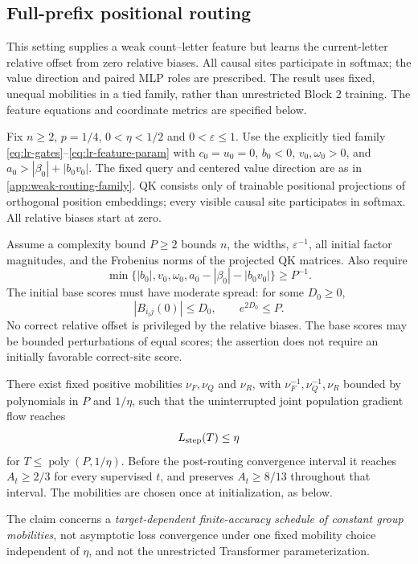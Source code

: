\subsection{Full-prefix positional routing}
\label{app:weak-seeded-full-prefix-routing}

This setting supplies a weak count--letter feature but learns the current-letter
relative offset from zero relative biases. All causal sites participate in
softmax; the value direction and paired MLP roles are prescribed. The result
uses fixed, unequal mobilities in a tied family, rather than unrestricted Block 2
training. The feature equations and coordinate metrics are specified below.

\begin{lrtheorem}
\label{thm:lr-conditional-bridge}
Fix $n\ge2$, $p=1/4$, $0<\eta<1/2$ and $0<\varepsilon\le1$.
Use the explicitly tied family \eqref{eq:lr-gates}--\eqref{eq:lr-feature-param}
with $c_0=u_0=0$, $b_0<0$, $v_0,\omega_0>0$, and
$a_0>|\beta_0|+|b_0v_0|$. The fixed query and centered value direction
are as in \cref{app:weak-routing-family}. QK consists only of trainable
positional projections of orthogonal position embeddings; every visible
causal site participates in softmax. All relative biases start at zero.

Assume a complexity bound $P\ge2$ bounds $n$, the widths,
$\varepsilon^{-1}$, all initial factor magnitudes, and the Frobenius norms
of the projected QK matrices. Also require
\[
 \min\{|b_0|,v_0,\omega_0,a_0-|\beta_0|-|b_0v_0|\}\ge P^{-1}.
\]
The initial base scores must have moderate spread: for some $D_0\ge0$,
\[
 |B_{i_tj}(0)|\le D_0,\qquad e^{2D_0}\le P.
\]
No correct relative offset is privileged by the relative biases. The base
scores may be bounded perturbations of equal scores; the assertion does
not require an initially favorable correct-site score.

There exist fixed positive mobilities $\nu_F,\nu_Q$ and $\nu_R$, with
$\nu_F^{-1},\nu_Q^{-1},\nu_R$ bounded by polynomials in $P$ and $1/\eta$,
such that the uninterrupted joint population gradient flow reaches
\begin{equation}\label{eq:lr-finite-theorem}
 L_{\mathrm{step}}(T)\le\eta
\end{equation}
for $T\le\operatorname{poly}(P,1/\eta)$.
Before the post-routing convergence interval it reaches $A_t\ge2/3$
for every supervised $t$, and preserves $A_t\ge8/13$ throughout that
interval. The mobilities are chosen once at initialization, as below.

The claim concerns a \emph{target-dependent finite-accuracy schedule of
constant group mobilities}, not asymptotic loss convergence under one
fixed mobility choice independent of $\eta$, and not the unrestricted
Transformer parameterization.
\end{lrtheorem}
